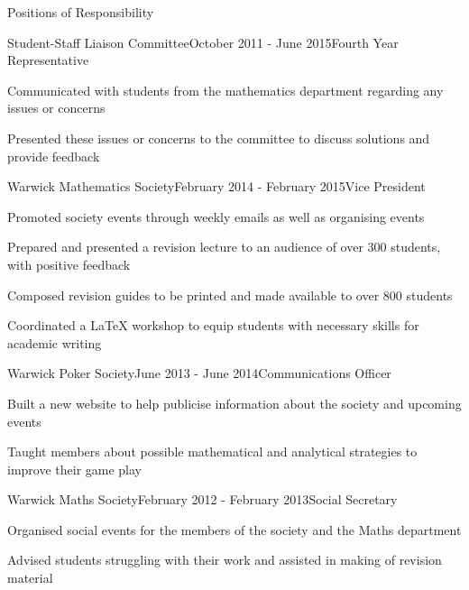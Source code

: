 \documentclass{resume} %
\begin{document}

\begin{rSection}{Positions of Responsibility}


\begin{rSubsection}{Student-Staff Liaison Committee}{October 2011 - June 2015}{Fourth Year Representative}{}
\item Communicated with students from the mathematics department regarding any issues or concerns
\item Presented these issues or concerns to the committee to discuss solutions and provide feedback
\end{rSubsection}


\begin{rSubsection}{Warwick Mathematics Society}{February 2014 - February 2015}{Vice President}{}
\item Promoted society events through weekly emails as well as organising events
\item Prepared and presented a revision lecture to an audience of over 300 students, with positive feedback
\item Composed revision guides to be printed and made available to over 800 students
\item Coordinated a LaTeX workshop to equip students with necessary skills for academic writing

\end{rSubsection}


\begin{rSubsection}{Warwick Poker Society}{June 2013 - June 2014}{Communications Officer}{}
\item Built a new website to help publicise information about the society and upcoming events
\item Taught members about possible mathematical and analytical strategies to improve their game play 
\end{rSubsection}



\begin{rSubsection}{Warwick Maths Society}{February 2012 - February 2013}{Social Secretary}{}
\item Organised social events for the members of the society and the Maths department
\item Advised students struggling with their work and assisted in making of revision material
\end{rSubsection}


\end{rSection}
\end{document}
